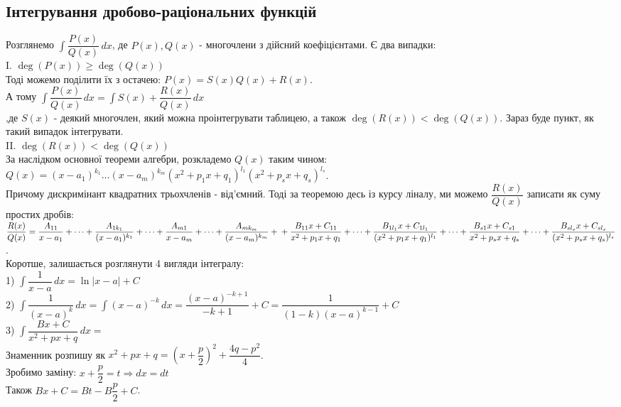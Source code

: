 \documentclass[a4paper, 10pt]{article}
\def\huge{\displaystyle}
\theoremstyle{theoremdd}
\theoremstyle{theoremdd}
\theoremstyle{theoremdd}
\theoremstyle{theoremdd}
\theoremstyle{theoremdd}
\theoremstyle{theoremdd}
\theoremstyle{theoremdd}
\theoremstyle{theoremdd}
\begin{document}
\subsection{Інтегрування дробово-раціональних функцій}
Розглянемо $\huge \int \dfrac{P(x)}{Q(x)}\,dx$, де $P(x), Q(x)$ - многочлени з дійсний коефіцієнтами. Є два випадки:\\
I. $\deg(P(x)) \geq \deg(Q(x))$\\
Тоді можемо поділити їх з остачею: $P(x) = S(x)Q(x) + R(x)$.\\
А тому $\huge \int \dfrac{P(x)}{Q(x)}\,dx = \int S(x) + \dfrac{R(x)}{Q(x)}\,dx$\\
,де $S(x)$ - деякий многочлен, який можна проінтегрувати таблицею, а також $\deg(R(x)) < \deg(Q(x))$. Зараз буде пункт, як такий випадок інтегрувати.
\bigskip \\
II. $\deg(R(x)) < \deg(Q(x))$\\
За наслідком основної теореми алгебри, розкладемо $Q(x)$ таким чином: \\
$Q(x) = (x-a_1)^{k_1} \dots (x-a_m)^{k_m} (x^2+p_1x+q_1)^{l_1} (x^2+p_sx+q_s)^{l_s}$. \\
Причому дискримінант квадратних трьохчленів - від'ємний. Тоді за теоремою десь із курсу ліналу, ми можемо $\dfrac{R(x)}{Q(x)}$ записати як суму простих дробів:\\
$\dfrac{R(x)}{Q(x)} = \dfrac{A_{11}}{x-a_1} + \dots + \dfrac{A_{1k_1}}{(x-a_1)^{k_1}}+ \dots + \dfrac{A_{m1}}{x-a_m} + \dots + \dfrac{A_{mk_m}}{(x-a_m)^{k_m}} + \\
+ \dfrac{B_{11}x + C_{11}}{x^2+p_1x+q_1} + \dots + \dfrac{B_{1l_1}x + C_{1l_1}}{(x^2+p_1x+q_1)^{l_1}} + \dots + \dfrac{B_{s1}x + C_{s1}}{x^2+p_sx+q_s} + \dots + \dfrac{B_{sl_s}x + C_{sl_s}}{(x^2+p_sx+q_s)^{l_s}}$.\\
Коротше, залишається розглянути 4 вигляди інтегралу:
\bigskip \\
1) $\huge \int \dfrac{1}{x-a}\,dx = \ln|x-a| + C$
\bigskip \\
2) $\huge \int \dfrac{1}{(x-a)^k}\,dx = \int (x-a)^{-k}\,dx = \dfrac{(x-a)^{-k+1}}{-k+1} + C = \dfrac{1}{(1-k)(x-a)^{k-1}} + C$
\bigskip \\
3) $\huge \int \dfrac{Bx+C}{x^2+px+q}\,dx \boxed{=}$\\
Знаменник розпишу як $x^2 + px + q = \left(x + \dfrac{p}{2} \right)^2 + \dfrac{4q-p^2}{4}$.\\
Зробимо заміну: $x + \dfrac{p}{2} = t \Rightarrow dx = dt$\\
Також $Bx+C = Bt - B\dfrac{p}{2} + C$.\\
\end{document}
